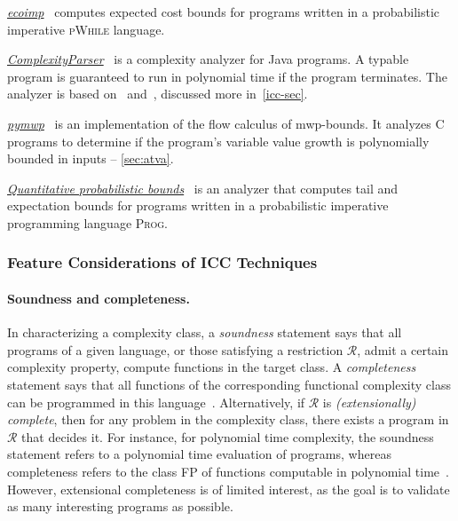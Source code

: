 \begin{description}
\item \href{https://www-sop.inria.fr/members/Martin.Avanzini/software/eco-imp/}%
      {\emph{ecoimp}}~\cite{avanzini2020}
      computes expected cost bounds for programs written in a probabilistic imperative \textsc{pWhile} language.

\item \href{https://gitlab.inria.fr/complexityparser/complexityparser/-/tree/master}{\emph{ComplexityParser}}~\cite{hainry2021}
      is a complexity analyzer for Java programs.
      A typable program is guaranteed to run in polynomial time if the program terminates.
      The analyzer is based on~\cite{hainry2015} and~\cite{hainry2018}, discussed more in~\autoref{icc-sec}.

\item \href{https://github.com/statycc/pymwp}{\emph{pymwp}}~\cite{aubert2023b}
      is an implementation of the flow calculus of mwp-bounds.
      It analyzes C programs to determine if the program's variable value growth is polynomially bounded in inputs -- \autoref{sec:atva}.

\item \href{https://zenodo.org/records/10457566}{\emph{Quantitative probabilistic bounds}}~\cite{chatterjee2024}
      is an analyzer that computes tail and expectation bounds for programs written in a probabilistic imperative programming language \textsc{Prog}.

\end{description}

\subsubsection{Feature Considerations of ICC Techniques}\label{icc-feat}

\paragraph*{Soundness and completeness.}
In characterizing a complexity class,
a \emph{soundness} statement says that all programs of a given language, or those satisfying a restriction \(\mathcal{R}\), admit a certain complexity property, \ie compute functions in the target class.
A \emph{completeness} statement says that all functions of the corresponding functional complexity class can be programmed in this language~\cite{baillot2012}.
Alternatively, if \(\mathcal{R}\) is \emph{(extensionally) complete}, then for any problem in the complexity class, there exists a program in \(\mathcal{R}\) that decides it.
For instance, for polynomial time complexity, the soundness statement refers to a polynomial time evaluation of programs, whereas completeness refers to the class FP of functions computable in polynomial time~\cite{baillot2012}.
However, extensional completeness is of limited interest, as the goal is to validate as many interesting programs as possible.

